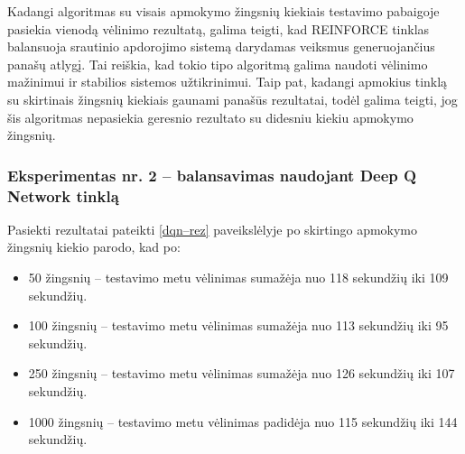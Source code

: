 \documentclass{VUMIFPSbakalaurinis}
\begin{document}
Kadangi algoritmas su visais apmokymo žingsnių kiekiais testavimo pabaigoje pasiekia vienodą vėlinimo rezultatą, galima teigti, kad REINFORCE tinklas balansuoja srautinio apdorojimo sistemą darydamas veiksmus generuojančius panašų atlygį. Tai reiškia, kad tokio tipo algoritmą galima naudoti vėlinimo mažinimui ir stabilios sistemos užtikrinimui. Taip pat, kadangi apmokius tinklą su skirtinais žingsnių kiekiais gaunami panašūs rezultatai, todėl galima teigti, jog šis algoritmas nepasiekia geresnio rezultato su didesniu kiekiu apmokymo žingsnių.

\subsubsection{Eksperimentas nr. 2 – balansavimas naudojant Deep Q Network tinklą}
Pasiekti rezultatai pateikti \ref{dqn–rez} paveikslėlyje po skirtingo apmokymo žingsnių kiekio parodo, kad po:
\begin{itemize}
    \item 50 žingsnių – testavimo metu vėlinimas sumažėja nuo 118 sekundžių iki 109 sekundžių. 
    \item 100 žingsnių – testavimo metu vėlinimas sumažėja nuo 113 sekundžių iki 95 sekundžių.
    \item 250 žingsnių – testavimo metu vėlinimas sumažėja nuo 126 sekundžių iki 107 sekundžių.
    \item 1000 žingsnių – testavimo metu vėlinimas padidėja nuo 115 sekundžių iki 144 sekundžių.
\end{itemize}
\end{document}
